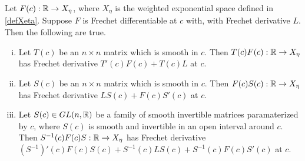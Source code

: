 \documentclass[thesis.tex]{subfiles}
\begin{document}
\begin{lemma}\label{frechetproductlemma}
Let $F(c): \mathbb{R} \rightarrow X_\eta$, where $X_\eta$ is the weighted exponential space defined in \eqref{defXeta}. Suppose $F$ is Frechet differentiable at $c$ with, with Frechet derivative $L$. Then the following are true.

\begin{enumerate}[(i)]
\item Let $T(c)$ be an $n \times n$ matrix which is smooth in $c$. Then $T(c)F(c): \mathbb{R} \rightarrow X_\eta$ has Frechet derivative $T'(c)F(c) + T(c)L$ at $c$.

\item Let $S(c)$ be an $n \times n$ matrix which is smooth in $c$. Then $F(c)S(c): \mathbb{R} \rightarrow X_\eta$ has Frechet derivative $L S(c) + F(c)S'(c)$ at $c$.

\item Let $S(c) \in GL(n, \mathbb{R})$ be a family of smooth invertible matrices paramaterized by $c$, where $S(c)$ is smooth and invertible in an open interval around $c$. Then $S^{-1}(c)F(c)S: \mathbb{R} \rightarrow X_\eta$ has Frechet derivative $(S^{-1})'(c) F(c) S(c) + S^{-1}(c) L S (c) + S^{-1}(c) F(c) S'(c)$ at $c$.
\end{enumerate}


\end{lemma}
\end{document}

